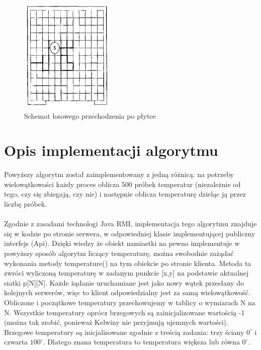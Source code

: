 \documentclass[11pt,a4paper]{article}
\begin{document}
\begin{figure}[H]
\begin{center}
\includegraphics[width=0.4\textwidth]{random_walk.png}
\caption{Schemat losowego przechodzenia po płytce}
\end{center}
\end{figure}

\section{Opis implementacji algorytmu}
Powyższy algorytm został zaimplementowany z jedną różnicą: na potrzeby wielowątkowości każdy proces oblicza 500 próbek temperatur (niezależnie od tego, czy się zbiegają, czy nie) i następnie oblicza temperaturę dzieląc ją przez liczbę próbek.\\
\\
Zgodnie z zasadami technologi Java RMI, implementacja tego algorytmu znajduje się w kodzie po stronie serwera, w odpowiedniej klasie implementującej publiczny interfejs (Api). Dzięki wiedzy że obiekt namiastki na pewno implementuje w powyższy sposób algorytm liczący temperaturę, można swobodnie zażądać wykonania metody temperature() na tym obiekcie po stronie klienta. Metoda ta zwróci wyliczoną temperaturę w zadanym punkcie [x,y] na podstawie aktualnej siatki p[N][N]. Każde żądanie uruchamiane jest jako nowy wątek przesłany do kolejnych serwerów, więc to klient odpowiedzialny jest za samą wielowątkowość.
\\
Obliczone i początkowe temperatury przechowujemy w tablicy o wymiarach N na N. Wszystkie temperatury oprócz brzegowych są zainicjalizowane wartością -1 (można tak zrobić, ponieważ Kelwiny nie przyjmują ujemnych wartości). Brzegowe temperatury są inicjalizowane zgodnie z treścią zadania: trzy ściany $0^{\circ}$ i czwarta $100^{\circ}$. Dlatego znana temperatura to temperatura większa lub równa $0^{\circ}$.
\end{document}
